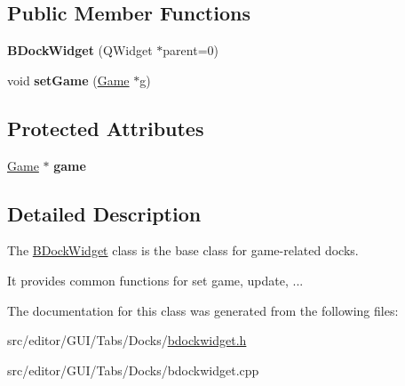 \subsection*{\-Public \-Member \-Functions}
\begin{DoxyCompactItemize}
\item 
\hypertarget{class_b_dock_widget_ac054be8dfe8c967910190cc31689a2d0}{{\bfseries \-B\-Dock\-Widget} (\-Q\-Widget $\ast$parent=0)}\label{class_b_dock_widget_ac054be8dfe8c967910190cc31689a2d0}

\item 
\hypertarget{class_b_dock_widget_a47e19ff81c8dbe1fbb6f528bec7bdc2f}{void {\bfseries set\-Game} (\hyperlink{class_game}{\-Game} $\ast$g)}\label{class_b_dock_widget_a47e19ff81c8dbe1fbb6f528bec7bdc2f}

\end{DoxyCompactItemize}
\subsection*{\-Protected \-Attributes}
\begin{DoxyCompactItemize}
\item 
\hypertarget{class_b_dock_widget_a2cd159222e09c8034a5ee46628a95fc0}{\hyperlink{class_game}{\-Game} $\ast$ {\bfseries game}}\label{class_b_dock_widget_a2cd159222e09c8034a5ee46628a95fc0}

\end{DoxyCompactItemize}


\subsection{\-Detailed \-Description}
\-The \hyperlink{class_b_dock_widget}{\-B\-Dock\-Widget} class is the base class for game-\/related docks. 

\-It provides common functions for set game, update, ... 

\-The documentation for this class was generated from the following files\-:\begin{DoxyCompactItemize}
\item 
src/editor/\-G\-U\-I/\-Tabs/\-Docks/\hyperlink{bdockwidget_8h}{bdockwidget.\-h}\item 
src/editor/\-G\-U\-I/\-Tabs/\-Docks/bdockwidget.\-cpp\end{DoxyCompactItemize}
